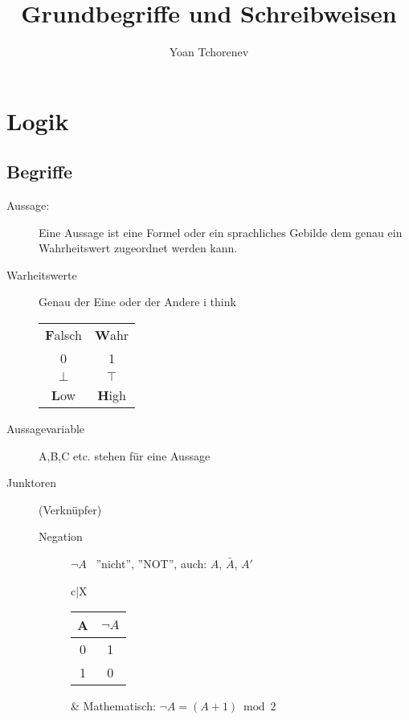 \documentclass[12pt,a4paper]{article}
\title{Grundbegriffe und Schreibweisen}
\author{Yoan Tchorenev}
\begin{document}
\begin{titlepage}
	\maketitle
	\tableofcontents
\end{titlepage}

\section{Logik}
\subsection{Begriffe}
\begin{description}
	\item[Aussage:] Eine Aussage ist eine Formel oder ein sprachliches Gebilde dem genau ein Wahrheitswert zugeordnet werden kann.

	\item[Warheitswerte] Genau der Eine oder der Andere i think \\
		\begin{tabular}{c|c}
			\textbf{F}alsch & \textbf{W}ahr \\
			0               & 1             \\
			$\bot$          & $\top$        \\
			\textbf{L}ow    & \textbf{H}igh
		\end{tabular}

	\item[Aussagevariable] A,B,C etc. stehen für eine Aussage

	\item[Junktoren] (Verknüpfer)
		\begin{description}
			\item[Negation] $\neg A$ \, ''nicht'', ''NOT'', auch: $A$, $\bar{A}$, $A'$ \\
				\begin{tabularx}{\linewidth}{c|X}
					\begin{tabular}[t]{c|c}
						A & $\neg A$ \\ \hline
						0 & 1        \\
						1 & 0
					\end{tabular} &
					Mathematisch: $\neg A = (A + 1) \bmod 2$ \\ \hline
				\end{tabularx}


\end{description}
\end{description}
\end{document}
